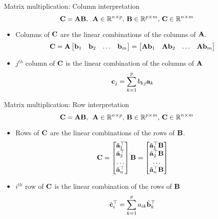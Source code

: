 \documentclass[aspectratio=169]{beamer}
\begin{document}
\begin{frame}[t]{Matrix multiplication: Column interpretation}
  \[ \mathbf{C} = \mathbf{A}\mathbf{B}, \,\,\, \mathbf{A} \in \mathbb{R}^{n \times p}, \, \mathbf{B} \in \mathbb{R}^{p \times m}, \, \mathbf{C} \in \mathbb{R}^{n \times m} \]
  \begin{itemize}
    \item Columns of $\mathbf{C}$ are the linear combinations of the columns of $\mathbf{A}$.
    \[ \mathbf{C} = \mathbf{A} \begin{bmatrix}
      \mathbf{b}_{1} & \mathbf{b}_{2} & \ldots & \mathbf{b}_{m}
    \end{bmatrix} = \begin{bmatrix}
      \mathbf{A}\mathbf{b}_{1} & \mathbf{A}\mathbf{b}_{2} & \ldots & \mathbf{A}\mathbf{b}_{m}
    \end{bmatrix} \]
    
    \item $j^{th}$ column of $\mathbf{C}$ is the linear combination of the columns of $\mathbf{A}$
    \[ \mathbf{c}_j = \sum_{k=1}^{p} b_{kj} \mathbf{a}_k \]
  \end{itemize}
\end{frame}


\begin{frame}[t]{Matrix multiplication: Row interpretation}
  \[ \mathbf{C} = \mathbf{A}\mathbf{B}, \,\,\, \mathbf{A} \in \mathbb{R}^{n \times p}, \, \mathbf{B} \in \mathbb{R}^{p \times m}, \, \mathbf{C} \in \mathbb{R}^{n \times m} \]
  \begin{itemize}
    \item Rows of $\mathbf{C}$ are the linear combinations of the rows of $\mathbf{B}$.
    \[ \mathbf{C} = \begin{bmatrix}
      \tilde{\mathbf{a}}_{1}^\top \\ \tilde{\mathbf{a}}_{2}^\top \\ \ldots \\ \tilde{\mathbf{a}}_{n}^\top
    \end{bmatrix} \mathbf{B}  = \begin{bmatrix}
      \tilde{\mathbf{a}}_{1}^\top \mathbf{B} \\ \tilde{\mathbf{a}}_{2}^\top \mathbf{B} \\ \ldots \\ \tilde{\mathbf{a}}_{n}^\top \mathbf{B}
    \end{bmatrix} \]
    
    \item $i^{th}$ row of $\mathbf{C}$ is the linear combination of the rows of $\mathbf{B}$
    \[ \tilde{\mathbf{c}}_i^\top = \sum_{k=1}^{p} a_{ik} \tilde{\mathbf{b}}_{k}^\top  \]
  \end{itemize}
\end{frame}
\end{document}

